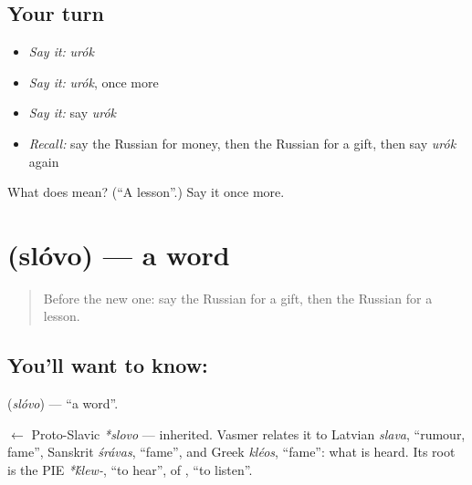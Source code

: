 \subsection*{Your turn}
\begin{itemize}
\raggedright
  \item \emph{Say it:} \emph{urók}
  \item \emph{Say it:} \emph{urók}, once more
  \item \emph{Say it:} say \emph{urók}
  \item \emph{Recall:} say the Russian for money, then the Russian for a gift, then say \emph{urók} again
\end{itemize}

\begin{tcolorbox}[breakable,colback=teal!4,colframe=teal!35!black,title={Before you move on}]
What does  mean? (\textquotedblleft{}A lesson\textquotedblright{}.) Say it once more.
\end{tcolorbox}
\section[\texorpdfstring{\ru{слово} (slóvo)}{слово (slóvo)}]{ (slóvo) — a word}

\label{lesson:RU-C54-word}



\begin{quote}
Before the new one: say the Russian for a gift, then the Russian for a lesson.
\end{quote}

\subsection*{You'll want to know: }
\textbf{} (\emph{slóvo}) — \textquotedblleft{}a word\textquotedblright{}.

\begin{cousinweb}
\textbf{} $\leftarrow$ Proto-Slavic \emph{*slovo} — inherited. Vasmer relates it to Latvian \emph{slava}, \textquotedblleft{}rumour, fame\textquotedblright{}, Sanskrit \emph{śrávas}, \textquotedblleft{}fame\textquotedblright{}, and Greek \emph{kléos}, \textquotedblleft{}fame\textquotedblright{}: what is heard. Its root is the PIE \emph{*\'{k}lew-}, \textquotedblleft{}to hear\textquotedblright{}, of \emph{}, \textquotedblleft{}to listen\textquotedblright{}.
\end{cousinweb}

